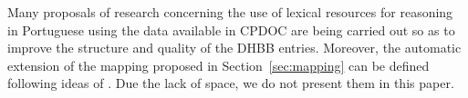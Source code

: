 
Many proposals of research concerning the use of lexical resources for
reasoning in Portuguese using the data available in CPDOC are being
carried out so as to improve the structure and quality of the DHBB
entries. Moreover, the automatic extension of the mapping proposed in
Section~\ref{sec:mapping} can be defined following ideas of
\cite{onto-context}. Due the lack of space, we do not present them in this
paper.

